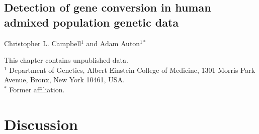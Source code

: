\documentclass[11pt,twoside,openright,letterpaper]{memoir}
\begin{document}


\begin{SingleSpace}
\chapter[Detection of gene conversion in human admixed population genetic data][A model for the detection of gene conversion]{Detection of gene conversion in human admixed population genetic data} \label{ch:geneConv}

\noindent Christopher L. Campbell$^1$ and Adam Auton$^{1*}$

\vspace{0.5cm}
\noindent This chapter contains unpublished data.\\

\vspace{0.5cm}
\noindent $^1$ Department of Genetics, Albert Einstein College of Medicine, 1301 Morris Park Avenue, Bronx, New York 10461, USA. \\
\noindent $^*$ Former affiliation.
\end{SingleSpace}



\chapter{Discussion} \label{ch:discussion}


\backmatter
\end{document}
